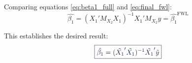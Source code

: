 \documentclass[11pt,letterpaper]{article}
\makeatletter
\theoremstyle{definition}
\renewenvironment{proof}[1][\proofname]{\par
  \pushQED{\qed}%
  \normalfont \topsep6\p@\@plus6\p@\relax
  \trivlist
  \item[\hskip\labelsep
        \itshape\bfseries\color{accentblue}
    #1\@addpunct{.}]\ignorespaces
}{%
  \popQED\endtrivlist\@endpefalse
}
\makeatother
\begin{document}
\begin{proof}
Comparing equations \eqref{eq:beta1_full} and \eqref{eq:final_fwl}:
\begin{equation}
\hat{\beta_1} = (X_1'M_{X_2}X_1)^{-1}X_1'M_{X_2}y = \hat{\beta_1}^{\text{FWL}}
\end{equation}

This establishes the desired result:
\begin{equation}
\textcolor{primaryblue}{\boxed{\hat{\beta_1} = (\tilde{X_1}'\tilde{X_1})^{-1}\tilde{X_1}'\tilde{y}}}
\end{equation}
\end{proof}
\end{document}
